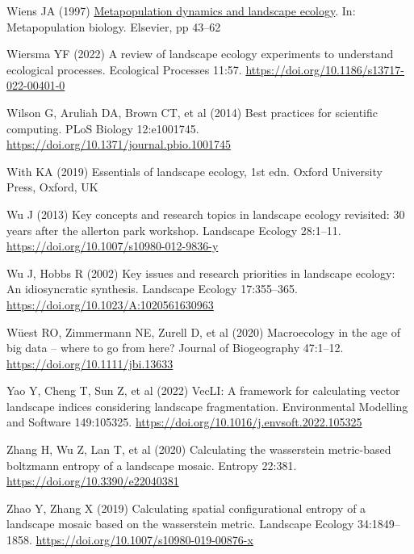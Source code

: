 \documentclass[
  10pt,
  a4paperpaper,
]{article}
\newlength{\cslhangindent}
\newenvironment{CSLReferences}[2] %
 {\begin{list}{}{%
  \setlength{\itemindent}{0pt}
  \setlength{\leftmargin}{0pt}
  \setlength{\parsep}{0pt}
  \ifodd #1
   \setlength{\leftmargin}{\cslhangindent}
   \setlength{\itemindent}{-1\cslhangindent}
  \fi
  \setlength{\itemsep}{#2\baselineskip}}}
 {\end{list}}
\begin{document}
\begin{CSLReferences}{1}{1}
Wiens JA (1997)
\href{https://doi.org/10.1016/B978-012323445-2/50005-5}{Metapopulation
dynamics and landscape ecology}. In: Metapopulation biology. Elsevier,
pp 43--62

Wiersma YF (2022) A review of landscape ecology experiments to
understand ecological processes. Ecological Processes 11:57.
\url{https://doi.org/10.1186/s13717-022-00401-0}

Wilson G, Aruliah DA, Brown CT, et al (2014) Best practices for
scientific computing. PLoS Biology 12:e1001745.
\url{https://doi.org/10.1371/journal.pbio.1001745}

With KA (2019) Essentials of landscape ecology, 1st edn. Oxford
University Press, Oxford, UK

Wu J (2013) Key concepts and research topics in landscape ecology
revisited: 30 years after the allerton park workshop. Landscape Ecology
28:1--11. \url{https://doi.org/10.1007/s10980-012-9836-y}

Wu J, Hobbs R (2002) Key issues and research priorities in landscape
ecology: An idiosyncratic synthesis. Landscape Ecology 17:355--365.
\url{https://doi.org/10.1023/A:1020561630963}

Wüest RO, Zimmermann NE, Zurell D, et al (2020) Macroecology in the age
of big data -- where to go from here? Journal of Biogeography 47:1--12.
\url{https://doi.org/10.1111/jbi.13633}

Yao Y, Cheng T, Sun Z, et al (2022) VecLI: A framework for calculating
vector landscape indices considering landscape fragmentation.
Environmental Modelling and Software 149:105325.
\url{https://doi.org/10.1016/j.envsoft.2022.105325}

Zhang H, Wu Z, Lan T, et al (2020) Calculating the wasserstein
metric-based boltzmann entropy of a landscape mosaic. Entropy 22:381.
\url{https://doi.org/10.3390/e22040381}

Zhao Y, Zhang X (2019) Calculating spatial configurational entropy of a
landscape mosaic based on the wasserstein metric. Landscape Ecology
34:1849--1858. \url{https://doi.org/10.1007/s10980-019-00876-x}

\end{CSLReferences}

\endgroup
\end{document}
